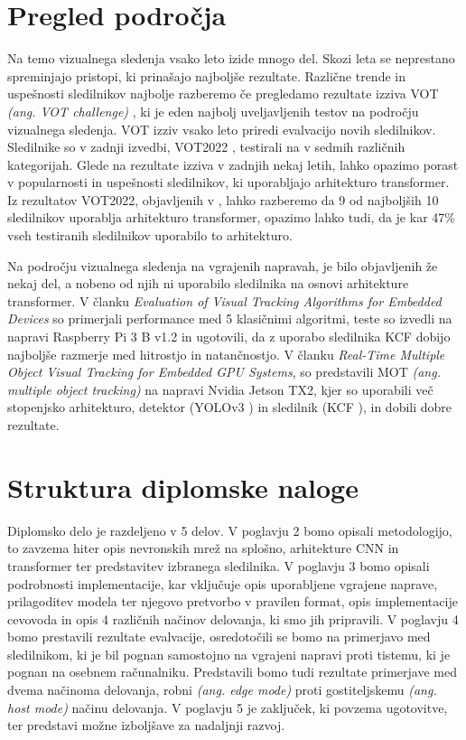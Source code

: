 \documentclass[a4paper,12pt,openright]{book}
\begin{document}
\section{Pregled področja}
Na temo vizualnega sledenja vsako leto izide mnogo del. Skozi leta se neprestano spreminjajo pristopi, ki prinašajo najboljše rezultate. Različne trende in uspešnosti sledilnikov najbolje razberemo če pregledamo rezultate izziva VOT \emph{(ang. VOT challenge)} \cite{vot}, ki je eden najbolj uveljavljenih testov na področju vizualnega sledenja. VOT izziv vsako leto priredi evalvacijo novih sledilnikov. Sledilnike so v zadnji izvedbi, VOT2022 \cite{vot2022}, testirali na v sedmih različnih kategorijah. Glede na rezultate izziva v zadnjih nekaj letih, lahko opazimo porast v popularnosti in uspešnosti sledilnikov, ki uporabljajo arhitekturo transformer. Iz rezultatov VOT2022, objavljenih v \cite{vot2022}, lahko razberemo da 9 od najboljših 10 sledilnikov uporablja arhitekturo transformer, opazimo lahko tudi, da je kar 47\% vseh testiranih sledilnikov uporabilo to arhitekturo.

Na področju vizualnega sledenja na vgrajenih napravah, je bilo objavljenih že nekaj del, a nobeno od njih ni uporabilo sledilnika na osnovi arhitekture transformer. V članku \emph{Evaluation of Visual Tracking Algorithms for Embedded Devices}\cite{evaluation_of_visual_tracking_algorithms_for_embedded_devices} so primerjali performance med 5 klasičnimi algoritmi, teste so izvedli na napravi Raspberry Pi 3 B v1.2 in ugotovili, da z uporabo sledilnika KCF dobijo najboljše razmerje med hitrostjo in natančnostjo. V članku \emph{Real-Time Multiple Object Visual Tracking for Embedded GPU Systems}\cite{real_time_multiple_object_visual_tracking_for_embedded_gpu_systems}, so predstavili MOT \emph{(ang. multiple object tracking)} na napravi Nvidia Jetson TX2, kjer so uporabili več stopenjsko arhitekturo, detektor (YOLOv3 \cite{yolov3}) in sledilnik (KCF \cite{kcf}), in dobili dobre rezultate.


\section{Struktura diplomske naloge}
Diplomsko delo je razdeljeno v 5 delov. V poglavju 2 bomo opisali metodologijo, to zavzema hiter opis nevronskih mrež na splošno, arhitekture CNN in transformer ter predstavitev izbranega sledilnika. V poglavju 3 bomo opisali podrobnosti implementacije, kar vključuje opis uporabljene vgrajene naprave, prilagoditev modela ter njegovo pretvorbo v pravilen format, opis implementacije cevovoda in opis 4 različnih načinov delovanja, ki smo jih pripravili. V poglavju 4 bomo prestavili rezultate evalvacije, osredotočili se bomo na primerjavo med sledilnikom, ki je bil pognan samostojno na vgrajeni napravi proti tistemu, ki je pognan na osebnem računalniku. Predstavili bomo tudi rezultate primerjave med dvema načinoma delovanja, robni \emph{(ang. edge mode)} proti gostiteljskemu \emph{(ang. host mode)} načinu delovanja. V poglavju 5 je zaključek, ki povzema ugotovitve, ter predstavi možne izboljšave za nadaljnji razvoj.
\end{document}
